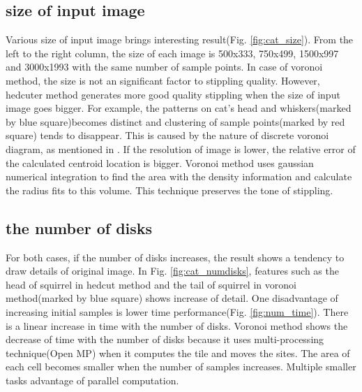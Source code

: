 \documentclass[11pt]{article}
\begin{document}
\subsection{size of input image}
Various size of input image brings interesting result(Fig. \ref{fig:cat_size}). From the left to the right column, the size of each image is 500x333, 750x499, 1500x997 and 3000x1993 with the same number of sample points. In case of voronoi method, the size is not an significant factor to stippling quality. However, hedcuter method generates more good quality stippling when the size of input image goes bigger. For example, the patterns on cat's head and whiskers(marked by blue square)becomes distinct and clustering of sample points(marked by red square) tends to disappear. This is caused by the nature of discrete voronoi diagram, as mentioned in \cite{secord02}. If the resolution of image is lower, the relative error of the calculated centroid location is bigger. Voronoi method uses gaussian numerical integration to find the area with the density information and calculate the radius fits to this volume. This technique preserves the tone of stippling.
\subsection{the number of disks}
For both cases, if the number of disks increases, the result shows a tendency to draw details of original image. In Fig. \ref{fig:cat_numdisks}, features such as the head of squirrel in hedcut method and the tail of squirrel in voronoi method(marked by blue square) shows increase of detail. One disadvantage of increasing initial samples is lower time performance(Fig. \ref{fig:num_time}). There is a linear increase in time with the number of disks. Voronoi method shows the decrease of time with the number of disks because it uses multi-processing technique(Open MP) when it computes the tile and moves the sites. The area of each cell becomes smaller when the number of samples increases. Multiple smaller tasks advantage of parallel computation.
\end{document}

